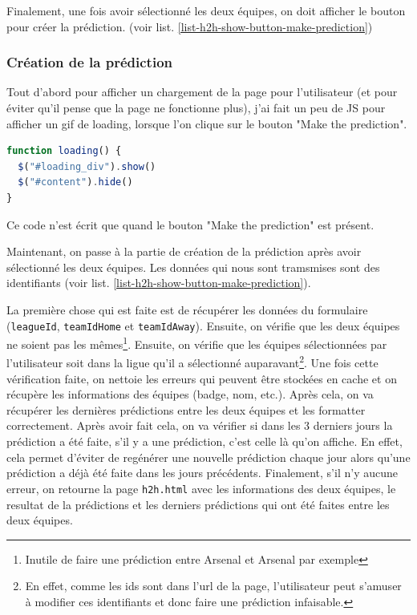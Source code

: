 \documentclass[a4paper,14pt]{extarticle}
\begin{document}
{

Finalement, une fois avoir sélectionné les deux équipes, on doit afficher le bouton pour créer la prédiction. (voir list. \ref{list-h2h-show-button-make-prediction})


\subsubsection{Création de la prédiction}

Tout d'abord pour afficher un chargement de la page pour l'utilisateur (et pour éviter qu'il pense que la page ne fonctionne plus), j'ai fait un peu de JS pour afficher un gif de loading, lorsque l'on clique sur le bouton "Make the prediction". 

\begin{lstlisting}[language=JavaScript, firstnumber=1, caption=Affichage du loading lors de la création de la prédiction, captionpos=b, label=jsLoading]
function loading() {
  $("#loading_div").show()
  $("#content").hide()
}
\end{lstlisting}

Ce code n'est écrit que quand le bouton "Make the prediction" est présent.

Maintenant, on passe à la partie de création de la prédiction après avoir sélectionné les deux équipes. Les données qui nous sont tramsmises sont des identifiants (voir list. \ref{list-h2h-show-button-make-prediction}).

La première chose qui est faite est de récupérer les données du formulaire (\texttt{leagueId}, \texttt{teamIdHome} et \texttt{teamIdAway}). Ensuite, on vérifie que les deux équipes ne soient pas les mêmes\footnote{Inutile de faire une prédiction entre Arsenal et Arsenal par exemple}. Ensuite, on vérifie que les équipes sélectionnées par l'utilisateur soit dans la ligue qu'il a sélectionné auparavant\footnote{En effet, comme les ids sont dans l'url de la page, l'utilisateur peut s'amuser à modifier ces identifiants et donc faire une prédiction infaisable.}. Une fois cette vérification faite, on nettoie les erreurs qui peuvent être stockées en cache et on récupère les informations des équipes (badge, nom, etc.). Après cela, on va récupérer les dernières prédictions entre les deux équipes et les formatter correctement. Après avoir fait cela, on va vérifier si dans les 3 derniers jours la prédiction a été faite, s'il y a une prédiction, c'est celle là qu'on affiche. En effet, cela permet d'éviter de regénérer une nouvelle prédiction chaque jour alors qu'une prédiction a déjà été faite dans les jours précédents. Finalement, s'il n'y aucune erreur, on retourne la page \texttt{h2h.html} avec les informations des deux équipes, le resultat de la prédictions et les derniers prédictions qui ont été faites entre les deux équipes.

}
\end{document}
